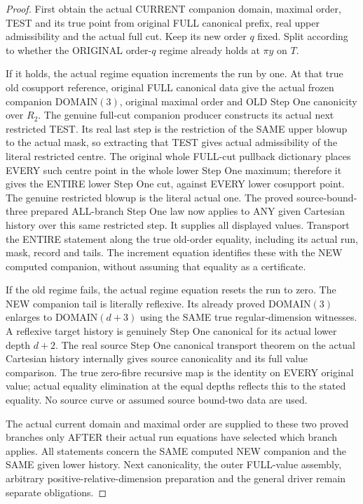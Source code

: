 \begin{proof}
First obtain the actual CURRENT companion domain, maximal order, TEST
and its true point from original FULL canonical prefix, real upper
admissibility and the actual full cut. Keep its new order $q$ fixed.
Split according to whether the ORIGINAL order-$q$ regime already holds
at $\pi y$ on $T$.

If it holds, the actual regime equation increments the run by one.
At that true old cosupport reference, original FULL canonical data give
the actual frozen companion DOMAIN$(3)$, original maximal order and
OLD Step One canonicity over $R_2$. The genuine full-cut companion
producer constructs its actual next restricted TEST. Its real last
step is the restriction of the SAME upper blowup to the actual mask,
so extracting that TEST gives actual admissibility of the literal
restricted centre. The original whole FULL-cut pullback dictionary
places EVERY such centre point in the whole lower Step One maximum;
therefore it gives the ENTIRE lower Step One cut, against EVERY lower
cosupport point. The genuine restricted blowup is the literal actual
one. The proved source-bound-three prepared ALL-branch Step One law
now applies to ANY given Cartesian history over this same restricted
step. It supplies all displayed values. Transport the ENTIRE statement
along the true old-order equality, including its actual run, mask,
record and tails. The increment equation identifies these with the
NEW computed companion, without assuming that equality as a certificate.

If the old regime fails, the actual regime equation resets the run to
zero. The NEW companion tail is literally reflexive. Its already proved
DOMAIN$(3)$ enlarges to DOMAIN$(d+3)$ using the SAME true regular-dimension
witnesses. A reflexive target history is genuinely Step One canonical
for its actual lower depth $d+2$. The real source Step One canonical
transport theorem on the actual Cartesian history internally gives
source canonicality and its full value comparison. The true zero-fibre
recursive map is the identity on EVERY original value; actual equality
elimination at the equal depths reflects this to the stated equality.
No source curve or assumed source bound-two data are used.

The actual current domain and maximal order are supplied to these two
proved branches only AFTER their actual run equations have selected
which branch applies. All statements concern the SAME computed NEW
companion and the SAME given lower history. Next canonicality, the
outer FULL-value assembly, arbitrary positive-relative-dimension
preparation and the general driver remain separate obligations.
\end{proof}
